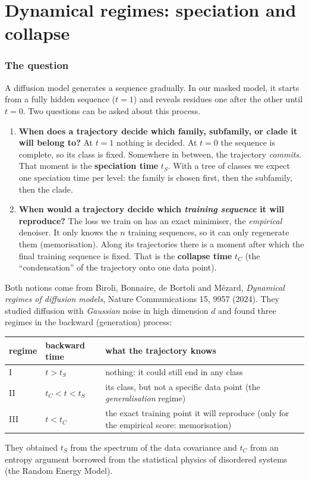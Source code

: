 \part{Dynamical regimes: speciation and collapse}

\section{The question}\label{sec:dr_question}
A diffusion model generates a sequence gradually. In our masked model, it starts from a fully hidden sequence
($t=1$) and reveals residues one after the other until $t=0$. Two questions can be asked about this process.
\begin{enumerate}[nosep]
\item \textbf{When does a trajectory decide which family, subfamily, or clade it will belong to?} At $t=1$ nothing is
decided. At $t=0$ the sequence is complete, so its class is fixed. Somewhere in between, the trajectory
\emph{commits}. That moment is the \textbf{speciation time} $t_S$. With a tree of classes we expect one speciation time
per level: the family is chosen first, then the subfamily, then the clade.
\item \textbf{When would a trajectory decide which \emph{training sequence} it will reproduce?} The loss we train on
has an exact minimiser, the \emph{empirical} denoiser. It only knows the $n$ training sequences, so it can only
regenerate them (memorisation). Along its trajectories there is a moment after which the final training sequence is
fixed. That is the \textbf{collapse time} $t_C$ (the ``condensation'' of the trajectory onto one data point).
\end{enumerate}
Both notions come from Biroli, Bonnaire, de Bortoli and Mézard, \emph{Dynamical regimes of diffusion models},
Nature Communications 15, 9957 (2024). They studied diffusion with \emph{Gaussian} noise in high dimension $d$ and
found three regimes in the backward (generation) process:
\begin{center}\small
\begin{tabular}{llp{9cm}}
\toprule
regime & backward time & what the trajectory knows\\
\midrule
I & $t>t_S$ & nothing: it could still end in any class\\
II & $t_C<t<t_S$ & its class, but not a specific data point (the \emph{generalisation} regime)\\
III & $t<t_C$ & the exact training point it will reproduce (only for the empirical score: memorisation)\\
\bottomrule
\end{tabular}
\end{center}
They obtained $t_S$ from the spectrum of the data covariance and $t_C$ from an entropy argument borrowed from the
statistical physics of disordered systems (the Random Energy Model).

